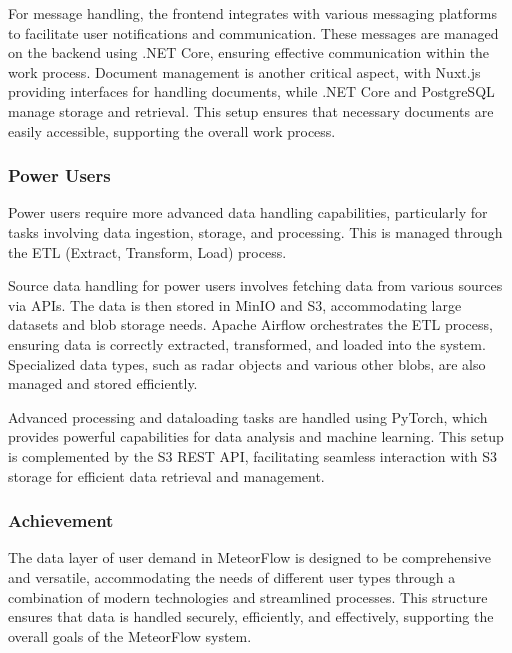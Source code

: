 For message handling, the frontend integrates with various messaging platforms
to facilitate user notifications and communication. These messages are managed
on the backend using .NET Core, ensuring effective communication within the work
process. Document management is another critical aspect, with Nuxt.js providing
interfaces for handling documents, while .NET Core and PostgreSQL manage storage
and retrieval. This setup ensures that necessary documents are easily
accessible, supporting the overall work process.

\subsubsection*{Power Users}

Power users require more advanced data handling capabilities, particularly for
tasks involving data ingestion, storage, and processing. This is managed through
the ETL (Extract, Transform, Load) process.

Source data handling for power users involves fetching data from various sources
via APIs. The data is then stored in MinIO and S3, accommodating large datasets
and blob storage needs. Apache Airflow orchestrates the ETL process, ensuring
data is correctly extracted, transformed, and loaded into the system.
Specialized data types, such as radar objects and various other blobs, are also
managed and stored efficiently.

Advanced processing and dataloading tasks are handled using PyTorch, which
provides powerful capabilities for data analysis and machine learning. This
setup is complemented by the S3 REST API, facilitating seamless interaction with
S3 storage for efficient data retrieval and management.

\subsubsection*{Achievement}

The data layer of user demand in MeteorFlow is designed to be comprehensive and
versatile, accommodating the needs of different user types through a combination
of modern technologies and streamlined processes. This structure ensures that
data is handled securely, efficiently, and effectively, supporting the overall
goals of the MeteorFlow system.